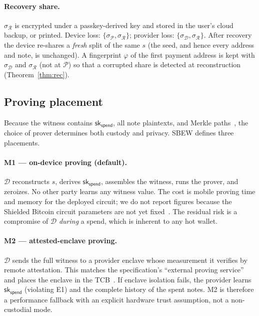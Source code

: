 \documentclass[11pt]{article}
\theoremstyle{remark}
\newcommand{\sk}{\mathsf{sk}}
\newcommand{\SB}{Shielded Bitcoin}
\newcommand{\sysname}{\textsf{SBEW}}
\begin{document}
\paragraph{Recovery share.} $\sigma_{\mathcal{R}}$ is encrypted under a passkey-derived key and stored in the user's cloud backup, or printed. Device loss: $\{\sigma_{\mathcal{P}}, \sigma_{\mathcal{R}}\}$; provider loss: $\{\sigma_{\mathcal{D}}, \sigma_{\mathcal{R}}\}$. After recovery the device re-shares a \emph{fresh} split of the same $s$ (the seed, and hence every address and note, is unchanged). A fingerprint $\varphi$ of the first payment address is kept with $\sigma_{\mathcal{D}}$ and $\sigma_{\mathcal{R}}$ (not at $\mathcal{P}$) so that a corrupted share is detected at reconstruction (Theorem~\ref{thm:rec}).

\subsection{Proving placement}
\label{sec:proving}
Because the witness contains $\sk_{\mathsf{spend}}$, all note plaintexts, and Merkle paths~\cite[§14.3]{sb26}, the choice of prover determines both custody and privacy. \sysname{} defines three placements.

\paragraph{M1 --- on-device proving (default).} $\mathcal{D}$ reconstructs $s$, derives $\sk_{\mathsf{spend}}$, assembles the witness, runs the prover, and zeroizes. No other party learns any witness value. The cost is mobile proving time and memory for the deployed circuit; we do not report figures because the \SB{} circuit parameters are not yet fixed~\cite[§22.1]{sb26}. The residual risk is a compromise of $\mathcal{D}$ \emph{during} a spend, which is inherent to any hot wallet.

\paragraph{M2 --- attested-enclave proving.} $\mathcal{D}$ sends the full witness to a provider enclave whose measurement it verifies by remote attestation. This matches the specification's ``external proving service''~\cite[App.~A.1]{sb26} and places the enclave in the TCB~\cite[§10]{sb26}. If enclave isolation fails, the provider learns $\sk_{\mathsf{spend}}$ (violating E1) and the complete history of the spent notes. M2 is therefore a performance fallback with an explicit hardware trust assumption, not a non-custodial mode.
\end{document}
